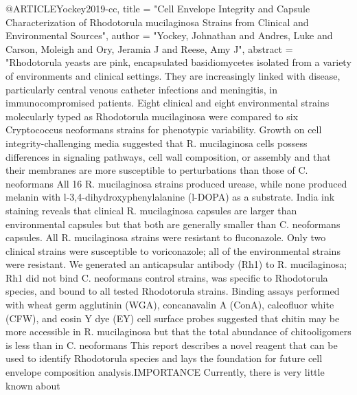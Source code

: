 @ARTICLE{Yockey2019-cc,
  title     = "Cell Envelope Integrity and Capsule Characterization of
               Rhodotorula mucilaginosa Strains from Clinical and Environmental
               Sources",
  author    = "Yockey, Johnathan and Andres, Luke and Carson, Moleigh and Ory,
               Jeramia J and Reese, Amy J",
  abstract  = "Rhodotorula yeasts are pink, encapsulated basidiomycetes
               isolated from a variety of environments and clinical settings.
               They are increasingly linked with disease, particularly central
               venous catheter infections and meningitis, in immunocompromised
               patients. Eight clinical and eight environmental strains
               molecularly typed as Rhodotorula mucilaginosa were compared to
               six Cryptococcus neoformans strains for phenotypic variability.
               Growth on cell integrity-challenging media suggested that R.
               mucilaginosa cells possess differences in signaling pathways,
               cell wall composition, or assembly and that their membranes are
               more susceptible to perturbations than those of C. neoformans
               All 16 R. mucilaginosa strains produced urease, while none
               produced melanin with l-3,4-dihydroxyphenylalanine (l-DOPA) as a
               substrate. India ink staining reveals that clinical R.
               mucilaginosa capsules are larger than environmental capsules but
               that both are generally smaller than C. neoformans capsules. All
               R. mucilaginosa strains were resistant to fluconazole. Only two
               clinical strains were susceptible to voriconazole; all of the
               environmental strains were resistant. We generated an
               anticapsular antibody (Rh1) to R. mucilaginosa; Rh1 did not bind
               C. neoformans control strains, was specific to Rhodotorula
               species, and bound to all tested Rhodotorula strains. Binding
               assays performed with wheat germ agglutinin (WGA), concanavalin
               A (ConA), calcofluor white (CFW), and eosin Y dye (EY) cell
               surface probes suggested that chitin may be more accessible in
               R. mucilaginosa but that the total abundance of chitooligomers
               is less than in C. neoformans This report describes a novel
               reagent that can be used to identify Rhodotorula species and
               lays the foundation for future cell envelope composition
               analysis.IMPORTANCE Currently, there is very little known about
}
